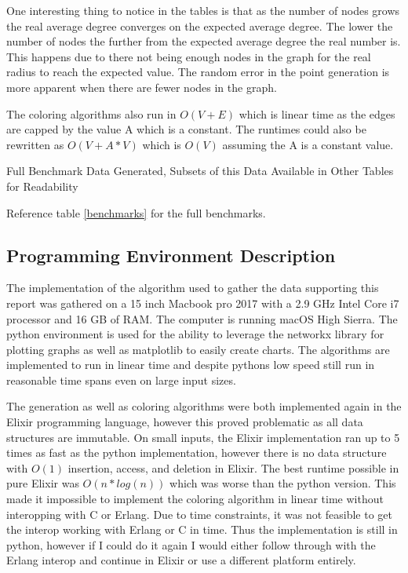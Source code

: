 \documentclass{article}
\begin{document}
	One interesting thing to notice in the tables is that as the number of nodes grows the real average degree converges on the expected average degree.
	The lower the number of nodes the further from the expected average degree the real number is.
	This happens due to there not being enough nodes in the graph for the real radius to reach the expected value.
  The random error in the point generation is more apparent when there are fewer nodes in the graph.

  The coloring algorithms also run in $O(V+E)$ which is linear time as the edges are capped by the value A which is a constant.
  The runtimes could also be rewritten as $O(V + A*V)$ which is $O(V)$ assuming the A is a constant value.

  \begin{table}
    \label{benchmarks}
    \centering
    \begin{adjustbox}{width=1\textwidth}
    \end{adjustbox}
    \caption{Full Benchmark Data Generated, Subsets of this Data Available in Other Tables for Readability}
  \end{table}

  Reference table \ref{benchmarks} for the full benchmarks.

  \subsection{Programming Environment Description}
		The implementation of the algorithm used to gather the data supporting this report was gathered on a 15 inch Macbook pro 2017 with a 2.9 GHz Intel Core i7 processor and 16 GB of RAM.
		The computer is running macOS High Sierra.
    The python environment is used for the ability to leverage the networkx library for plotting graphs as well as matplotlib to easily create charts.
    The algorithms are implemented to run in linear time and despite pythons low speed still run in reasonable time spans even on large input sizes.

    The generation as well as coloring algorithms were both implemented again in the Elixir programming language, however this proved problematic as all data structures are immutable.
    On small inputs, the Elixir implementation ran up to 5 times as fast as the python implementation, however there is no data structure with $O(1)$ insertion, access, and deletion in Elixir.
    The best runtime possible in pure Elixir was $O(n*log(n))$ which was worse than the python version.
    This made it impossible to implement the coloring algorithm in linear time without interopping with C or Erlang.
    Due to time constraints, it was not feasible to get the interop working with Erlang or C in time.
    Thus the implementation is still in python, however if I could do it again I would either follow through with the Erlang interop and continue in Elixir or use a different platform entirely.
\end{document}
